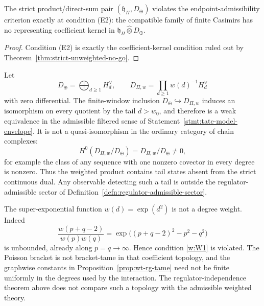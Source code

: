 \begin{cor}
\label{cor:strict-endpoint-obstruction-criterion}
  The strict product/direct-sum pair
  \((\mathfrak h_{\Pi},D_{\oplus})\) violates the
  endpoint-admissibility criterion exactly at condition (E2): the
  compatible family of finite Casimirs has no representing coefficient
  kernel in
  \(\mathfrak h_{\Pi}\widehat\otimes D_{\oplus}\).
\end{cor}

\begin{proof}
  Condition (E2) is exactly the coefficient-kernel condition ruled out
  by Theorem~\ref{thm:strict-unweighted-no-go}.
\end{proof}

\begin{prop}\label{ex:weighted-completion-changes-cohomology}
  Let
  \[
    D_{\oplus}=\bigoplus_{d\geq1}H_d^\vee,\qquad
    D_{\Pi,w}=\prod_{d\geq1}w(d)^{-1}H_d^\vee
  \]
  with zero differential.  The finite-window inclusion
  \(D_{\oplus}\hookrightarrow D_{\Pi,w}\) induces an isomorphism on
  every quotient by the tail \(d>w_0\), and therefore is a weak
  equivalence in the admissible filtered sense of
  Statement~\ref{stmt:tate-model-envelope}.  It is not a
  quasi-isomorphism in the ordinary category of chain complexes:
  \[
    H^0(D_{\Pi,w}/D_{\oplus})
      =D_{\Pi,w}/D_{\oplus}\neq0,
  \]
  for example the class of any sequence with one nonzero covector in
  every degree is nonzero.  Thus the weighted product contains
  tail states absent from the strict continuous dual.  Any observable
  detecting such a tail is outside the regulator-admissible sector of
  Definition~\ref{defn:regulator-admissible-sector}.
\end{prop}

\begin{ex}\label{ex:bad-weight-not-regulator}
  The super-exponential function \(w(d)=\exp(d^2)\) is not a degree
  weight.  Indeed
  \[
    \frac{w(p+q-2)}{w(p)w(q)}
      =\exp\bigl((p+q-2)^2-p^2-q^2\bigr)
  \]
  is unbounded, already along \(p=q\to\infty\).  Hence condition
  \ref{w:W1} is violated.  The Poisson bracket is not bracket-tame in that
  coefficient topology, and the graphwise constants in
  Proposition~\ref{prop:wt-rg-tame} need not be finite uniformly in the
  degrees used by the interaction.  The regulator-independence theorem
  above does not compare such a topology with the admissible weighted
  theory.
\end{ex}

